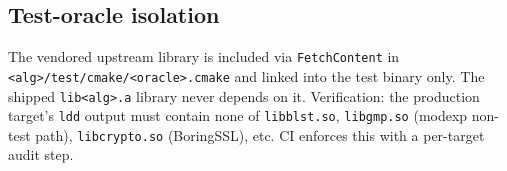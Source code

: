 \subsection{Test-oracle isolation}

The vendored upstream library is included via \texttt{FetchContent} in \texttt{<alg>/test/cmake/<oracle>.cmake} and linked into the test binary only. The shipped \texttt{lib<alg>.a} library never depends on it. Verification: the production target's \texttt{ldd} output must contain none of \texttt{libblst.so}, \texttt{libgmp.so} (modexp non-test path), \texttt{libcrypto.so} (BoringSSL), etc. CI enforces this with a per-target audit step.
